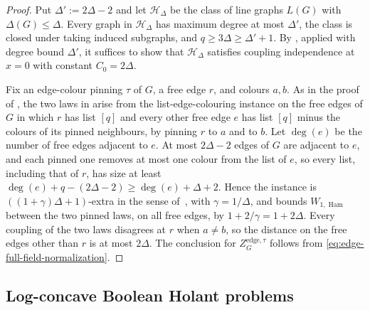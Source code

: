 \documentclass[11pt,reqno]{article}
\theoremstyle{plain}
\theoremstyle{definition}
\theoremstyle{remark}
\theoremstyle{definition}
\theoremstyle{remark}
\DeclareMathOperator{\Ham}{Ham}
\newcommand{\Deg}{\Delta}                        %
\newcommand{\WHam}{W_{1,\Ham}}                   %
\newcommand{\colours}{[q]}                        %
\begin{document}
\begin{proof}
Put \(\Deg':=2\Deg-2\) and let \(\mathcal H_\Deg\) be the class of line
graphs \(L(G)\) with \(\Delta(G)\le\Deg\).  Every graph in
\(\mathcal H_\Deg\) has maximum degree at most \(\Deg'\), the class is
closed under taking induced subgraphs, and \(q\ge3\Deg\ge\Deg'+1\).  By
, applied with degree bound \(\Deg'\), it
suffices to show that \(\mathcal H_\Deg\) satisfies coupling
independence at \(x=0\) with constant \(C_0=2\Deg\).

Fix an edge-colour pinning \(\tau\) of \(G\), a free edge \(r\), and
colours \(a,b\).  As in the proof of , the two laws in
 arise from the list-edge-colouring instance on the
free edges of \(G\) in which \(r\) has list \(\colours\) and every other
free edge \(e\) has list \(\colours\) minus the colours of its pinned
neighbours, by pinning \(r\) to \(a\) and to \(b\).  Let \(\deg(e)\) be
the number of free edges adjacent to \(e\).  At most \(2\Deg-2\) edges
of \(G\) are adjacent to \(e\), and each pinned one removes at most one
colour from the list of \(e\), so every list, including that of \(r\),
has size at least \(\deg(e)+q-(2\Deg-2)\ge\deg(e)+\Deg+2\).  Hence the
instance is \(((1+\gamma)\Deg+1)\)-extra in the sense
of~\cite{CWZZ2025}, with \(\gamma=1/\Deg\), and
\cite[Theorem~15]{CWZZ2025} bounds \(\WHam\) between the two pinned laws,
on all free edges, by \(1+2/\gamma=1+2\Deg\).
Every coupling of the two laws disagrees at \(r\) when \(a\ne b\), so the
distance on the free edges other than \(r\) is at most \(2\Deg\).  The
conclusion for \(Z_G^{\mathrm{edge},\tau}\) follows from
\eqref{eq:edge-full-field-normalization}.
\end{proof}

\subsection{Log-concave Boolean Holant problems}
\label{sec:holant-consequence}
\end{document}
